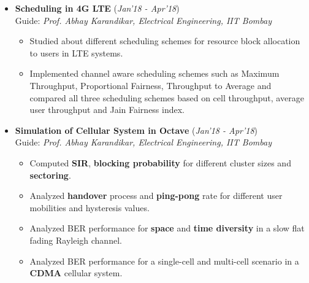 \documentclass[10pt]{article}
\begin{document}

\colorbox{bl}{}
\vspace{-0.5cm}
\begin{itemize}[leftmargin=0.4cm]


	
\item \textbf{Scheduling in 4G LTE }
\hfill{(\textit{Jan'18 - Apr'18})}\\
Guide: \textit{Prof. Abhay Karandikar, Electrical Engineering, IIT Bombay}\\
\vspace{-0.7cm}
	\begin{itemize}
	\item Studied about different scheduling schemes for resource block allocation to users in LTE systems.\vspace{-0.1cm}
	\item Implemented channel aware scheduling schemes such as Maximum Throughput, Proportional Fairness, Throughput to Average and compared all three scheduling schemes based on cell throughput, average user throughput and Jain Fairness index.
    \end{itemize}

	\vspace{-0.25cm}
	
	
\item \textbf{Simulation of Cellular System in Octave}
\hfill{(\textit{Jan'18 - Apr'18})}\\
Guide: \textit{Prof. Abhay Karandikar, Electrical Engineering, IIT Bombay}\\\vspace{-0.7cm}
	\begin{itemize}
	\item Computed \textbf{SIR}, \textbf{blocking probability} for different cluster sizes and \textbf{sectoring}.\vspace{-0.1cm}
	\item Analyzed \textbf{handover} process and \textbf{ping-pong} rate for different user mobilities and hysteresis values.\vspace{-0.1cm}
	\item Analyzed BER performance for \textbf{space} and \textbf{time diversity} in a slow flat fading Rayleigh channel.\vspace{-0.1cm}
	\item Analyzed BER performance for a single-cell and multi-cell scenario in a \textbf{CDMA} cellular system.
    \end{itemize}


\end{itemize}
\end{document}
